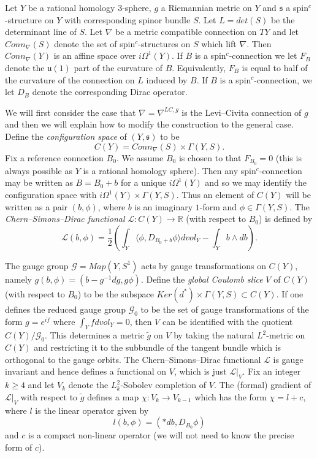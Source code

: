 \documentclass{amsart}
\theoremstyle{definition}
\theoremstyle{remark}
\numberwithin{equation}{section}
\begin{document}
Let $Y$ be a rational homology $3$-sphere, $g$ a Riemannian metric on $Y$ and $\mathfrak{s}$ a spin$^c$-structure on $Y$ with corresponding spinor bundle $S$. Let $L = det(S)$ be the determinant line of $S$. Let $\nabla$ be a metric compatible connection on $TY$ and let $Conn_{\nabla}(S)$ denote the set of spin$^c$-structures on $S$ which lift $\nabla$. Then $Conn_{\nabla}(Y)$ is an affine space over $i\Omega^1(Y)$. If $B$ is a spin$^c$-connection we let $F_B$ denote the $\mathfrak{u}(1)$ part of the curvature of $B$. Equivalently, $F_B$ is equal to half of the curvature of the connection on $L$ induced by $B$. If $B$ is a spin$^c$-connection, we let $D_B$ denote the corresponding Dirac operator.

We will first consider the case that $\nabla = \nabla^{LC,g}$ is the Levi--Civita connection of $g$ and then we will explain how to modify the construction to the general case. Define the {\em configuration space} of $(Y , \mathfrak{s})$ to be
\[
C(Y) = Conn_\nabla(S) \times \Gamma(Y , S).
\]
Fix a reference connection $B_0$. We assume $B_0$ is chosen to that $F_{B_0} = 0$ (this is always possible as $Y$ is a rational homology sphere). Then any spin$^c$-connection may be written as $B = B_0 + b$ for a unique $i\Omega^1(Y)$ and so we may identify the configuration space with $i\Omega^1(Y) \times \Gamma(Y , S)$. Thus an element of $C(Y)$ will be written as a pair $(b , \phi)$, where $b$ is an imaginary $1$-form and $\phi \in \Gamma(Y,S)$. The {\em Chern--Simons--Dirac functional} $\mathcal{L} : C(Y) \to \mathbb{R}$ (with respect to $B_0$) is defined by
\[
\mathcal{L}(b,\phi) = \frac{1}{2} \left( \int_Y \langle \phi , D_{B_0+b} \phi \rangle dvol_Y - \int_Y b \wedge db \right).
\]

The gauge group $\mathcal{G} = Map(Y , S^1)$ acts by gauge transformations on $C(Y)$, namely $g(b,\phi) = (b - g^{-1}dg , g\phi)$. Define the {\em global Coulomb slice} $V$ of $C(Y)$ (with respect to $B_0$) to be the subspace $Ker(d^*) \times \Gamma(Y , S) \subset C(Y)$. If one defines the reduced gauge group $\mathcal{G}_0$ to be the set of gauge transformations of the form $g = e^{if}$ where $\int_Y f dvol_Y = 0$, then $V$ can be identified with the quotient $C(Y)/\mathcal{G}_0$. This determines a metric $\widetilde{g}$ on $V$ by taking the natural $L^2$-metric on $C(Y)$ and restricting it to the subbundle of the tangent bundle which is orthogonal to the gauge orbits. The Chern--Simons--Dirac functional $\mathcal{L}$ is gauge invariant and hence defines a functional on $V$, which is just $\mathcal{L}|_V$. Fix an integer $k \ge 4$ and let $V_k$ denote the $L^2_k$-Sobolev completion of $V$. The (formal) gradient of $\mathcal{L}|_V$ with respect to $\widetilde{g}$ defines a map $\chi : V_k \to V_{k-1}$ which has the form $\chi = l + c$, where $l$ is the linear operator given by
\[
l(b,\phi) = (*db , D_{B_0}\phi)
\]
and $c$ is a compact non-linear operator (we will not need to know the precise form of $c$).
\end{document}

